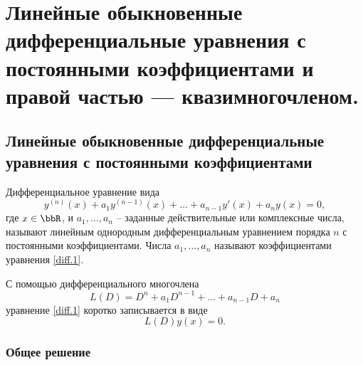 \chapter{Линейные обыкновенные дифференциальные уравнения с постоянными коэффициентами и правой частью — квазимногочленом.}

\section{Линейные обыкновенные дифференциальные уравнения с постоянными коэффициентами}

Дифференциальное уравнение вида
\begin{equation}\label{diff.1}
y^{(n)}(x)+a_1y^{(n-1)}(x)+\dots+a_{n-1}y'(x)+a_ny(x)=0,
\end{equation}
где $x\in \bbR$, и $a_1,\dots,a_n$ -- заданные действительные или комплексные числа, называют линейным однородным дифференциальным уравнением порядка $n$ с постоянными коэффициентами. Числа $a_1,\dots,a_n$ называют коэффициентами уравнения \eqref{diff.1}.

С помощью дифференциального многочлена 
$$
L(D)= D^n+a_1D^{n-1}+\dots+a_{n-1}D+a_n
$$
уравнение \eqref{diff.1} коротко записывается в виде 
\begin{equation}
L(D)y(x)=0.
\end{equation}
\subsection{Общее решение}

